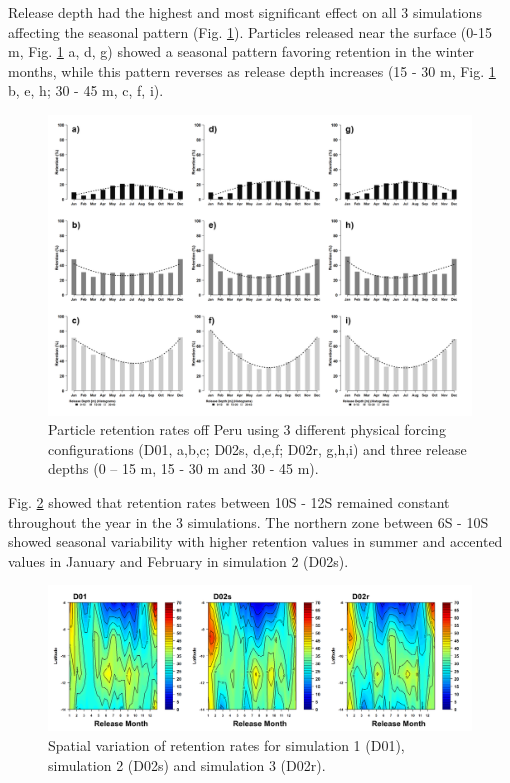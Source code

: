 Release depth had the highest and most significant effect on all 3 simulations affecting the seasonal pattern (Fig. \ref{Chap2Recruitment3sim3depth}). Particles released near the surface (0-15 m, Fig. \ref{Chap2Recruitment3sim3depth} a, d, g) showed a seasonal pattern favoring retention in the winter months, while this pattern reverses as release depth increases (15 - 30 m, Fig. \ref{Chap2Recruitment3sim3depth} b, e, h; 30 - 45 m, c, f, i).\\

\begin{figure}[ht]
	\includegraphics[width=1.0\textwidth]{figures/Chap2Recruitment3sim3depth.png}
	\centering
	\caption{Particle retention rates off Peru using 3 different physical forcing configurations (D01, a,b,c; D02s, d,e,f; D02r, g,h,i) and three release depths (0 – 15 m, 15 - 30 m and 30 - 45 m).}
	\label{Chap2Recruitment3sim3depth}
\end{figure}

Fig. \ref{Chap2SpatialVariation} showed that retention rates between 10\textdegree S - 12\textdegree S remained constant throughout the year in the 3 simulations. The northern zone between 6\textdegree S - 10\textdegree S showed seasonal variability with higher retention values in summer and accented values in January and February in simulation 2 (D02s).\\

\begin{center}
\begin{figure}[ht]
	\includegraphics[width=1.0\textwidth]{figures/Chap2SpatialVariation.png}
	\centering
	\caption{Spatial variation of retention rates for simulation 1 (D01), simulation 2 (D02s) and simulation 3 (D02r).}
	\label{Chap2SpatialVariation}
\end{figure}
\end{center}

